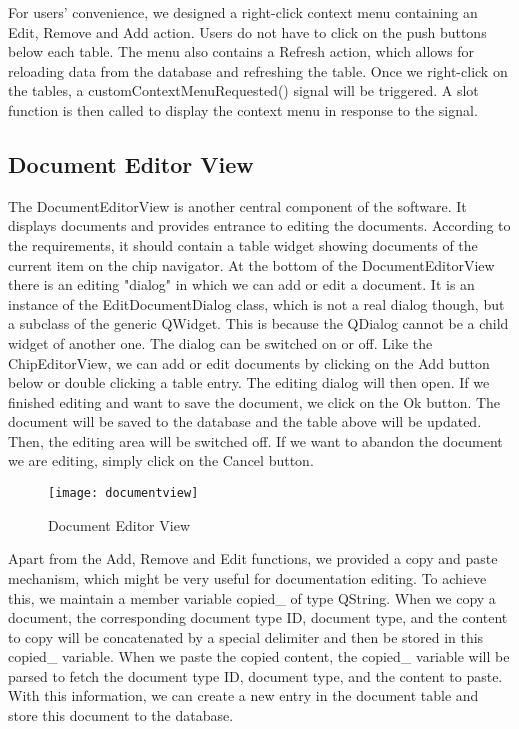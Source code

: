 For users' convenience, we designed a right-click context menu containing an Edit, Remove and Add action. Users do not have to click on the push buttons below each table. The menu also contains a Refresh action, which allows for reloading data from the database and refreshing the table. Once we right-click on the tables, a customContextMenuRequested() signal will be triggered. A slot function is then called to display the context menu in response to the signal.

\subsection{Document Editor View}
The DocumentEditorView is another central component of the software. It displays documents and provides entrance to editing the documents. According to the requirements, it should contain a table widget showing documents of the current item on the chip navigator. At the bottom of the DocumentEditorView there is an editing "dialog" in which we can add or edit a document. It is an instance of the EditDocumentDialog class, which is not a real dialog though, but a subclass of the generic QWidget. This is because the QDialog cannot be a child widget of another one. The dialog can be switched on or off. Like the ChipEditorView, we can add or edit documents by clicking on the Add button below or double clicking a table entry. The editing dialog will then open. If we finished editing and want to save the document, we click on the Ok button. The document will be saved to the database and the table above will be updated. Then, the editing area will be switched off. If we want to abandon the document we are editing, simply click on the Cancel button. 

\begin{figure}[htbp]
\centering
\texttt{[image: documentview]}
\caption{Document Editor View\label{fig:Document Editor View}}
\end{figure}

Apart from the Add, Remove and Edit functions, we provided a copy and paste mechanism, which might be very useful for documentation editing. To achieve this, we maintain a member variable copied\_ of type QString. When we copy a document, the corresponding document type ID, document type, and the content to copy will be concatenated by a special delimiter and then be stored in this copied\_ variable. When we paste the copied content, the copied\_ variable will be parsed to fetch the document type ID, document type, and the content to paste. With this information, we can create a new entry in the document table and store this document to the database.

